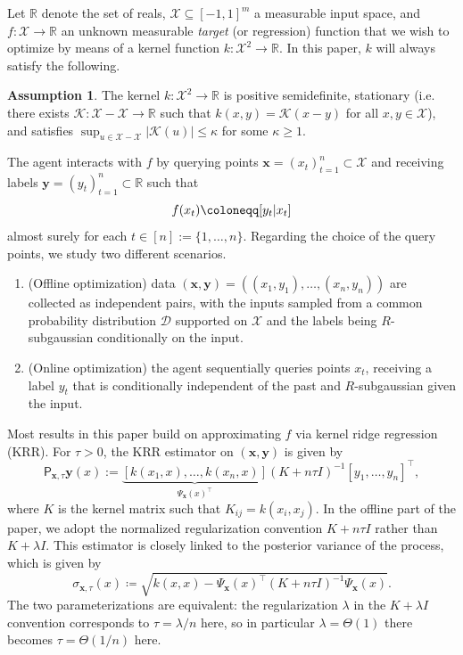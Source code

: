 \documentclass{article}
\let\E\relax
\DeclareMathOperator*{\E}{\mathbb E}
\numberwithin{theorem}{section}
\theoremstyle{definition}
\newtheorem{ass}[theorem]{Assumption}
\newcommand{\rX}{x}
\newcommand{\rY}{y}
\newcommand{\inpdist}{\Ds}
\newcommand{\Ds}{\mathcal D}
\newcommand{\Xs}{\mathcal X}
\begin{document}
Let $\mathbb R$ denote the set of reals, $\Xs\subseteq [-1,1]^m$ a measurable input space, and $f: \Xs \to \mathbb R$ an unknown measurable \emph{target} (or regression) function that we wish to optimize by means of a kernel function $k:\Xs^2\to \mathbb R$. In this paper, $k$ will always satisfy the following.
\begin{ass}\label{ass:valboundisoker}
    The kernel $k:\Xs^2\to \mathbb R$ is positive semidefinite, stationary (i.e. there exists $\mathscr K:\Xs-\Xs\to \mathbb R$ such that $k(x,y)=\mathscr K(x-y)$ for all $x,y\in \Xs$), and satisfies $\sup_{u\in \Xs-\Xs}|\mathscr K(u)|\le \kappa$ for some $\kappa\ge 1$.
\end{ass}
The agent interacts with $f$ by querying points $\bm x=(x_t)_{t=1}^n\subset \Xs$ and receiving labels $\bm y=(y_t)_{t=1}^n\subset \mathbb R$ such that
\[f(\rX_t) \coloneqq \E[\rY_t|\rX_t]\]
almost surely for each $t\in [n]:=\{1,\dots,n\}$.
Regarding the choice of the query points, we study two different scenarios.
\begin{enumerate}
    \item (Offline optimization) data $(\bm x,\bm y) = ((\rX_1, \rY_1),\dots,(\rX_n,\rY_n))$ are collected as independent pairs, with the inputs sampled from a common probability distribution $\inpdist$ supported on $\Xs$ and the labels being $R$-subgaussian conditionally on the input.
    \item (Online optimization) the agent sequentially queries points $\rX_t$, receiving a label $y_t$ that is conditionally independent of the past and $R$-subgaussian given the input.
\end{enumerate}
Most results in this paper build on approximating $f$ via kernel ridge regression (KRR).
For $\tau>0$, the KRR estimator on $(\bm x, \bm y)$ is given by
\begin{equation}
    \mathsf{P}_{\bm x,\tau}\bm y(x):=\underbrace{[k(x_1,x),\dots,k(x_n,x)]}_{\Psi_{\bm x}(x)^\top}(K+n\tau I)^{-1}[y_1,\dots,y_n]^\top
    \label{eq:krr},
\end{equation}
where $K$ is the kernel matrix such that $K_{ij}=k(x_i,x_j)$.
In the offline part of the paper, we adopt the normalized regularization convention $K+n\tau I$ rather than $K+\lambda I$.
This estimator is closely linked to the posterior variance of the process, which is given by
$$\sigma_{\bm x,\tau}(x) \coloneqq \sqrt{k(x,x)-\Psi_{\bm x}(x)^\top (K+n\tau I)^{-1}\Psi_{\bm x}(x)}.$$ 
The two parameterizations are equivalent: the regularization $\lambda$ in the $K+\lambda I$ convention corresponds to $\tau=\lambda/n$ here, so in particular $\lambda=\Theta(1)$ there becomes $\tau=\Theta(1/n)$ here.
\end{document}
